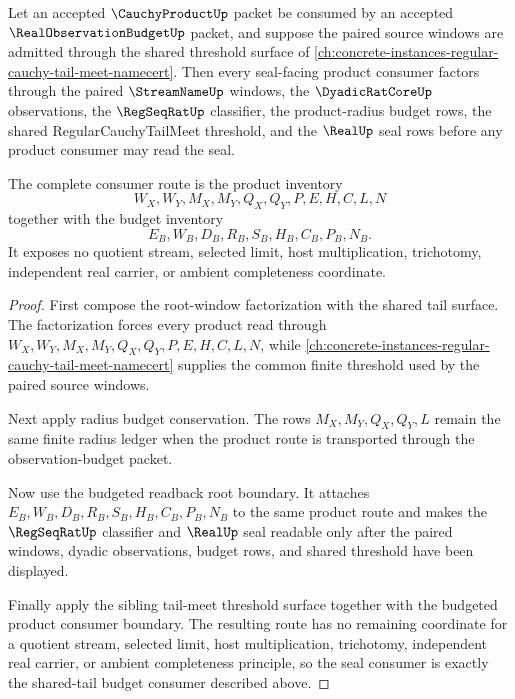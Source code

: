 \begin{theorem}
\label{thm:cauchy-product-shared-tail-budget-consumer}
Let an accepted $\CauchyProductUp$ packet be consumed by an accepted $\RealObservationBudgetUp$ packet, and suppose the paired source windows are admitted through the shared threshold surface of \autoref{ch:concrete-instances-regular-cauchy-tail-meet-namecert}. Then every seal-facing product consumer factors through the paired $\StreamNameUp$ windows, the $\DyadicRatCoreUp$ observations, the $\RegSeqRatUp$ classifier, the product-radius budget rows, the shared RegularCauchyTailMeet threshold, and the $\RealUp$ seal rows before any product consumer may read the seal.

The complete consumer route is the product inventory
$$
W_X,W_Y,M_X,M_Y,Q_X,Q_Y,P,E,H,C,L,N
$$
together with the budget inventory
$$
E_B,W_B,D_B,R_B,S_B,H_B,C_B,P_B,N_B.
$$
It exposes no quotient stream, selected limit, host multiplication, trichotomy, independent real carrier, or ambient completeness coordinate.
\end{theorem}
\begin{proof}
First compose the root-window factorization with the shared tail surface. The factorization forces every product read through $W_X,W_Y,M_X,M_Y,Q_X,Q_Y,P,E,H,C,L,N$, while \autoref{ch:concrete-instances-regular-cauchy-tail-meet-namecert} supplies the common finite threshold used by the paired source windows.

Next apply radius budget conservation. The rows $M_X,M_Y,Q_X,Q_Y,L$ remain the same finite radius ledger when the product route is transported through the observation-budget packet.

Now use the budgeted readback root boundary. It attaches $E_B,W_B,D_B,R_B,S_B,H_B,C_B,P_B,N_B$ to the same product route and makes the $\RegSeqRatUp$ classifier and $\RealUp$ seal readable only after the paired windows, dyadic observations, budget rows, and shared threshold have been displayed.

Finally apply the sibling tail-meet threshold surface together with the budgeted product consumer boundary. The resulting route has no remaining coordinate for a quotient stream, selected limit, host multiplication, trichotomy, independent real carrier, or ambient completeness principle, so the seal consumer is exactly the shared-tail budget consumer described above.
\end{proof}

